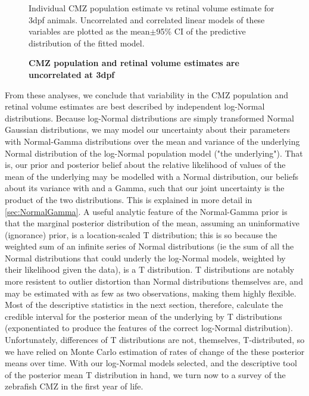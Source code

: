 \begin{figure}[!h]
    \caption{{\bf CMZ population and retinal volume estimates are uncorrelated at 3dpf}}
    Individual CMZ population estimate vs retinal volume estimate for 3dpf animals. Uncorrelated and correlated linear models of these variables are plotted as the mean$\pm$95\% CI of the predictive distribution of the fitted model.
    \label{gausscorrelation}
\end{figure}

From these analyses, we conclude that variability in the CMZ population and retinal volume estimates are best described by independent log-Normal distributions. Because log-Normal distributions are simply transformed Normal Gaussian distributions, we may model our uncertainty about their parameters with Normal-Gamma distributions over the mean and variance of the underlying Normal distribution of the log-Normal population model ("the underlying"). That is, our prior and posterior belief about the relative likelihood of values of the mean of the underlying may be modelled with a Normal distribution, our beliefs about its variance with and a Gamma, such that our joint uncertainty is the product of the two distributions. This is explained in more detail in \autoref{sec:NormalGamma}. A useful analytic feature of the Normal-Gamma prior is that the marginal posterior distribution of the mean, assuming an uninformative (ignorance) prior, is a location-scaled T distribution; this is so because the weighted sum of an infinite series of Normal distributions (ie the sum of all the Normal distributions that could underly the log-Normal models, weighted by their likelihood given the data), is a T distribution. T distributions are notably more resistent to outlier distortion than Normal distributions themselves are, and may be estimated with as few as two observations, making them highly flexible. Most of the descriptive statistics in the next section, therefore, calculate the credible interval for the posterior mean of the underlying by T distributions (exponentiated to produce the features of the correct log-Normal distribution). Unfortunately, differences of T distributions are not, themselves, T-distributed, so we have relied on Monte Carlo estimation of rates of change of the these posterior means over time. With our log-Normal models selected, and the descriptive tool of the posterior mean T distribution in hand, we turn now to a survey of the zebrafish CMZ in the first year of life.

